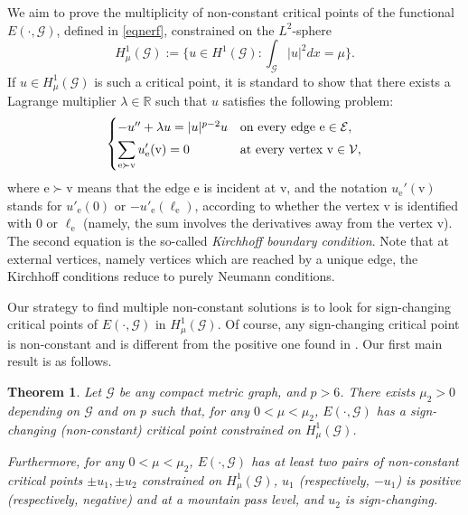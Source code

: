 \documentclass[10pt,a4paper]{article}
\newtheorem{theorem}{Theorem}[section]
\theoremstyle{definition} \theoremstyle{remark}
\numberwithin{equation}{section}
\newcommand{\G}{\mathcal{G}}
\newcommand{\la}{\lambda}
\newcommand{\incident}{\succ}
\newcommand{\edge}{{\mathrm e}} %
\newcommand{\vv}{{\mathrm{v}}}
\begin{document}
We aim to prove the multiplicity of non-constant critical points of the functional $E(\cdot,\mathcal{G})$, defined in \eqref{eqnerf}, constrained on the $L^2$-sphere
\begin{equation*}
	H_{\mu}^1(\mathcal{G})
	:= \bigl\{u\in H^1(\mathcal{G}):
	\int_{\mathcal{G}}|u|^2 dx=\mu \bigr\}.
\end{equation*}
If 
$u\in H^1_{\mu}(\mathcal{G})$ is such a critical point, it is standard to show that there exists a Lagrange multiplier $\lambda\in \mathbb{R}$ such that $u$ satisfies the following problem:
\begin{equation}\label{eqequwithkc}
	\begin{cases}
		-u''+\lambda u=|u|^{p-2}u
		&\text{on every edge } \edge \in \mathcal{E},\\[1\jot]
		\displaystyle
		\sum_{\edge \incident \vv} u_{\edge}'(\vv)=0
		&\text{at every vertex } \vv \in \mathcal{V},
	\end{cases}
\end{equation}
where $\edge \incident \vv$ means that the edge $\edge$ is incident at
$\vv$, and the notation $u_{\edge}'(\vv)$ stands for
$u'_{\edge}(0)$ or $-u'_{\edge}(\ell_{\edge})$, according to whether
the vertex $\vv$ is identified with $0$ or $\ell_{\edge}$ (namely, the
sum involves the derivatives away from the vertex $\vv$). The
second equation is the so-called \emph{Kirchhoff boundary condition}. Note that at external vertices, namely vertices which are reached by a unique edge, the Kirchhoff conditions reduce to purely Neumann conditions. 


Our strategy to find multiple non-constant solutions is to look for sign-changing critical points of $E(\cdot,\G)$ in $H^1_\mu(\G)$. Of course, any sign-changing critical point is non-constant and is different from the positive one found in \cite[Theorem 1.1]{CJS}. Our first main result is as follows.

\begin{theorem} \label{thmsc}
	Let $\G$ be any compact metric graph, and $p > 6$. There exists $\mu_2 > 0$ depending on $\G$ and on $p$ such that, for any $0 < \mu < \mu_2$, $E(\cdot,\G)$ has a sign-changing (non-constant) critical point constrained on $H^1_\mu(\G)$.
	
	Furthermore, for any $0 < \mu < \mu_2$, $E(\cdot,\G)$ has at least two pairs of non-constant critical points $\pm u_1, \pm u_2$ constrained on $H^1_\mu(\G)$, $u_1$ (respectively, $-u_1$) is positive (respectively, negative) and at a mountain pass level, and $u_2$ is sign-changing.
\end{theorem}
\end{document}
